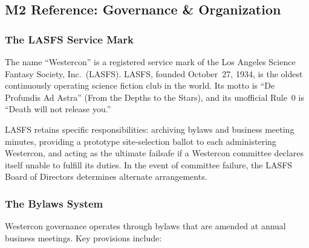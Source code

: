 \documentclass[11pt,letterpaper]{article}
\begin{document}
\subsection{M2 Reference: Governance \& Organization}

\subsubsection{The LASFS Service Mark}

The name ``Westercon'' is a registered service mark of the Los Angeles Science Fantasy Society, Inc.\ (LASFS). LASFS, founded October~27, 1934, is the oldest continuously operating science fiction club in the world. Its motto is ``De Profundis Ad Astra'' (From the Depths to the Stars), and its unofficial Rule~0 is ``Death will not release you.''

LASFS retains specific responsibilities: archiving bylaws and business meeting minutes, providing a prototype site-selection ballot to each administering Westercon, and acting as the ultimate failsafe if a Westercon committee declares itself unable to fulfill its duties. In the event of committee failure, the LASFS Board of Directors determines alternate arrangements.

\subsubsection{The Bylaws System}

Westercon governance operates through bylaws that are amended at annual business meetings. Key provisions include:
\end{document}
